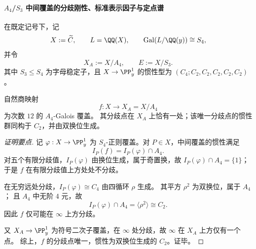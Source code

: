 \paragraph{\texorpdfstring{$A_4$}{A4}/\texorpdfstring{$S_3$}{S3} 中间覆盖的分歧刚性、标准表示因子与定点谱}
在既定记号下，记
\[
X:=\widetilde{C},\qquad
L=\QQ(X),\qquad
\mathrm{Gal}(L/\QQ(y))\cong S_4,
\]
并令
\[
X_A:=X/A_4,\qquad E:=X/S_3.
\]
其中 \(S_3\le S_4\) 为字母稳定子，且 \(X\to \PP^1_y\) 的惯性型为
\((C_4;C_2,C_2,C_2,C_2,C_2)\)。

\begin{conclusion}\label{con:xi-terminal-zm-a4-subcover-single-branch-rigidity}
自然商映射
\[
f:X\longrightarrow X_A=X/A_4
\]
为次数 \(12\) 的 \(A_4\)-Galois 覆盖。
其分歧点在 \(X_A\) 上恰有一处；该唯一分歧点的惯性群同构于 \(C_2\)，并由双换位生成。
\end{conclusion}
\begin{proof}[证明要点]
记 \(\varphi:X\to\PP^1_y\) 为 \(S_4\)-正则覆盖。对 \(P\in X\)，中间覆盖的惯性满足
\[
I_P(f)=I_P(\varphi)\cap A_4.
\]
对五个有限分歧值，\(I_P(\varphi)\) 由换位生成，属于奇置换，故
\(
I_P(\varphi)\cap A_4=\{1\}
\)；
于是 \(f\) 在有限分歧值上方处处不分歧。

在无穷远处分歧，\(I_P(\varphi)\cong C_4\) 由四循环 \(\rho\) 生成。
其平方 \(\rho^2\) 为双换位，属于 \(A_4\)；
且 \(A_4\) 中无阶 \(4\) 元，故
\[
I_P(\varphi)\cap A_4=\langle \rho^2\rangle\cong C_2.
\]
因此 \(f\) 仅可能在 \(\infty\) 上方分歧。

又 \(X_A\to \PP^1_y\) 为符号二次子覆盖，在 \(\infty\) 处分歧，故 \(\infty\) 在 \(X_A\) 上方仅有一个点。
综上，\(f\) 的分歧点唯一，惯性为双换位生成的 \(C_2\)。证毕。
\end{proof}

